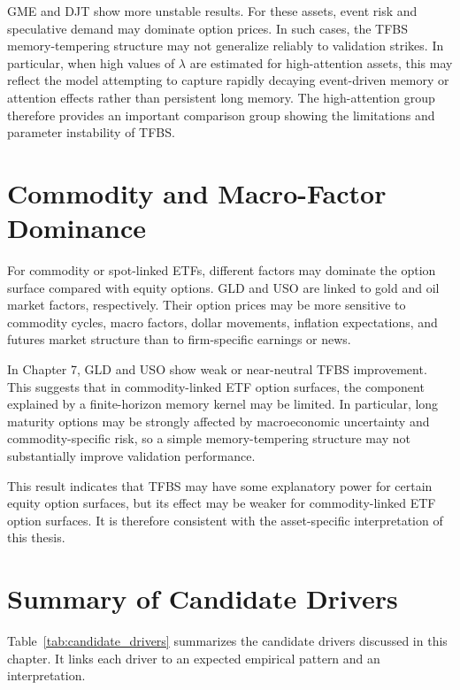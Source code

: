 \documentclass[11pt,a4paper]{report}
\begin{document}
GME and DJT show more unstable results. For these assets, event risk and speculative demand may dominate option prices. In such cases, the TFBS memory-tempering structure may not generalize reliably to validation strikes. In particular, when high values of $\lambda$ are estimated for high-attention assets, this may reflect the model attempting to capture rapidly decaying event-driven memory or attention effects rather than persistent long memory. The high-attention group therefore provides an important comparison group showing the limitations and parameter instability of TFBS.

\section{Commodity and Macro-Factor Dominance}

For commodity or spot-linked ETFs, different factors may dominate the option surface compared with equity options. GLD and USO are linked to gold and oil market factors, respectively. Their option prices may be more sensitive to commodity cycles, macro factors, dollar movements, inflation expectations, and futures market structure than to firm-specific earnings or news.

In Chapter 7, GLD and USO show weak or near-neutral TFBS improvement. This suggests that in commodity-linked ETF option surfaces, the component explained by a finite-horizon memory kernel may be limited. In particular, long maturity options may be strongly affected by macroeconomic uncertainty and commodity-specific risk, so a simple memory-tempering structure may not substantially improve validation performance.

This result indicates that TFBS may have some explanatory power for certain equity option surfaces, but its effect may be weaker for commodity-linked ETF option surfaces. It is therefore consistent with the asset-specific interpretation of this thesis.

\section{Summary of Candidate Drivers}

Table~\ref{tab:candidate_drivers} summarizes the candidate drivers discussed in this chapter. It links each driver to an expected empirical pattern and an interpretation.
\end{document}
